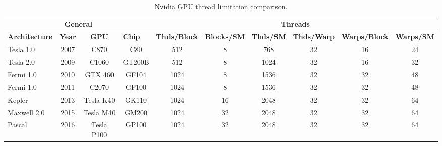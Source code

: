 \begin{table}[]
	\begin{adjustbox}{width=1\textwidth}
		\centering
		\begin{tabular}{|l|c|c|c|c|c|c|c|c|c|}
			\hline
			\multicolumn{4}{|c|}{\textbf{General}}                                            & \multicolumn{6}{c|}{\textbf{Threads}}                                                                                       \\ \hline
			\textbf{Architecture} & \textbf{Year} & \textbf{GPU} & \multicolumn{1}{l|}{\textbf{Chip}} & \textbf{Thds/Block} & \textbf{Blocks/SM} & \textbf{Thds/SM} & \textbf{Thds/Warp} & \textbf{Warps/Block} & \textbf{Warps/SM} \\ \hline
			Tesla 1.0     & 2007          & C870         & C80                                & 512                 & 8                  & 768              & 32                 & 16                   & 24                \\ \hline
			Tesla 2.0     & 2009          & C1060        & GT200B                             & 512                 & 8                  & 1024             & 32                 & 16                   & 32                \\ \hline
			Fermi 1.0     & 2010          & GTX 460      & GF104                              & 1024                & 8                  & 1536             & 32                 & 32                   & 48                \\ \hline
			Fermi 1.0     & 2011          & C2070        & GF100                              & 1024                & 8                  & 1536             & 32                 & 32                   & 48                \\ \hline
			Kepler        & 2013          & Tesla K40    & GK110                              & 1024                & 16                 & 2048             & 32                 & 32                   & 64                \\ \hline
			Maxwell 2.0   & 2015          & Tesla M40    & GM200                              & 1024                & 32                 & 2048             & 32                 & 32                   & 64                \\ \hline
			Pascal        & 2016          & Tesla P100   & GP100                              & 1024                & 32                 & 2048             & 32                 & 32                   & 64                \\ \hline
		\end{tabular}
	\end{adjustbox}
	\caption{Nvidia GPU thread limitation comparison. \cite{Li2016}}
	\label{alg-gpu-thd}
\end{table}

